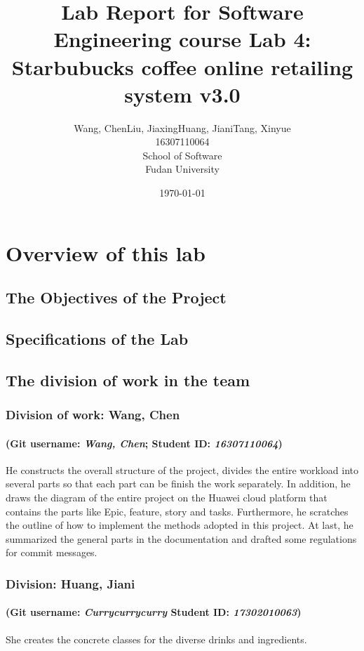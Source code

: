 \documentclass[a4paper]{report}
\title{Lab Report for Software Engineering course \newline
 Lab 4: Starbubucks coffee online retailing system v3.0}
\author{Wang, Chen\qquad Liu, Jiaxing\qquad Huang, Jiani\qquad Tang, Xinyue \\
16307110064\qquad17302010049\qquad 17302010063\qquad 16307110476 \\
School of Software\\
Fudan University
}
\date{\today}
\begin{document}
\maketitle

\tableofcontents
\chapter{Overview of this lab}
\section{The Objectives of the Project}
\section{Specifications of the Lab}
\section{The division of work in the team}

\subsection{Division of work: Wang, Chen}
\subsubsection{(Git username: \emph{Wang, Chen}; Student ID: \emph{16307110064})}
He constructs the overall structure of the project, divides the entire workload into several parts so that each part can be finish the work separately. In addition, he draws the diagram of the entire project on the Huawei cloud platform that contains the parts like Epic, feature, story and tasks. Furthermore, he scratches the outline of how to implement the methods adopted in this project. At last, he summarized the general parts in the documentation and drafted some regulations for commit messages.

\subsection{Division: Huang, Jiani}
\subsubsection{(Git username: \emph{Currycurrycurry} Student ID: \emph{17302010063})}
She creates the concrete classes for the diverse drinks and ingredients.
\end{document}
